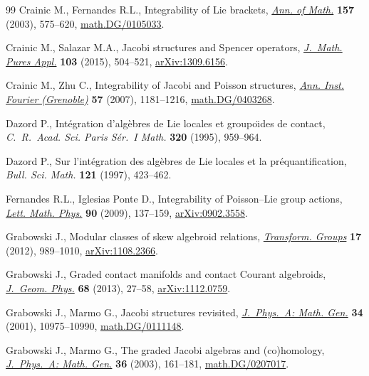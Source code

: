 \documentclass[10pt,a4paper]{amsart}
\numberwithin{equation}{section}
\begin{document}
\begin{thebibliography}{99}
Crainic M., Fernandes R.L., Integrability of {L}ie brackets, \href{https://doi.org/10.4007/annals.2003.157.575}{\textit{Ann. of
 Math.}} \textbf{157} (2003), 575--620, \href{https://arxiv.org/abs/math.DG/0105033}{math.DG/0105033}.

Crainic M., Salazar M.A., Jacobi structures and {S}pencer operators,
 \href{https://doi.org/10.1016/j.matpur.2014.04.012}{\textit{J.~Math. Pures Appl.}} \textbf{103} (2015), 504--521,
 \href{https://arxiv.org/abs/1309.6156}{arXiv:1309.6156}.

Crainic M., Zhu C., Integrability of {J}acobi and {P}oisson structures,
 \href{https://doi.org/10.5802/aif.2291}{\textit{Ann. Inst. Fourier (Grenoble)}} \textbf{57} (2007), 1181--1216,
 \href{https://arxiv.org/abs/math.DG/0403268}{math.DG/0403268}.

Dazord P., Int\'egration d'alg\`ebres de {L}ie locales et groupo\"\i des de
 contact, \textit{C.~R.~Acad. Sci. Paris S\'er.~I Math.} \textbf{320} (1995),
 959--964.

Dazord P., Sur l'int\'egration des alg\`ebres de {L}ie locales et la
 pr\'equantif\/ication, \textit{Bull. Sci. Math.} \textbf{121} (1997), 423--462.

Fernandes R.L., Iglesias Ponte D., Integrability of {P}oisson--{L}ie group
 actions, \href{https://doi.org/10.1007/s11005-009-0348-x}{\textit{Lett. Math. Phys.}} \textbf{90} (2009), 137--159,
 \href{https://arxiv.org/abs/0902.3558}{arXiv:0902.3558}.

Grabowski J., Modular classes of skew algebroid relations, \href{https://doi.org/10.1007/s00031-012-9197-2}{\textit{Transform.
 Groups}} \textbf{17} (2012), 989--1010, \href{https://arxiv.org/abs/1108.2366}{arXiv:1108.2366}.

Grabowski J., Graded contact manifolds and contact {C}ourant algebroids,
 \href{https://doi.org/10.1016/j.geomphys.2013.02.001}{\textit{J.~Geom. Phys.}} \textbf{68} (2013), 27--58, \href{https://arxiv.org/abs/1112.0759}{arXiv:1112.0759}.

Grabowski J., Marmo G., Jacobi structures revisited, \href{https://doi.org/10.1088/0305-4470/34/49/316}{\textit{J.~Phys.~A: Math.
 Gen.}} \textbf{34} (2001), 10975--10990, \href{https://arxiv.org/abs/math.DG/0111148}{math.DG/0111148}.

Grabowski J., Marmo G., The graded {J}acobi algebras and (co)homology,
 \href{http://doi.org/10.1088/0305-4470/36/1/311}{\textit{J.~Phys.~A: Math. Gen.}} \textbf{36} (2003), 161--181,
 \href{https://arxiv.org/abs/math.DG/0207017}{math.DG/0207017}.


\end{thebibliography}
\end{document}
